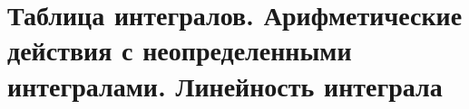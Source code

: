 \section{Таблица интегралов. Арифметические действия с неопределенными интегралами. Линейность интеграла}